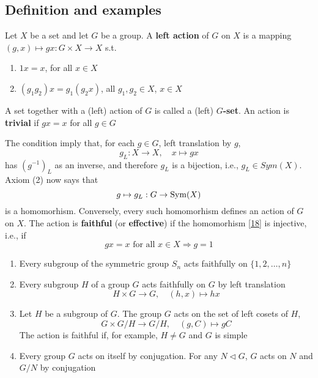 \documentclass[11pt]{article}
\begin{document}
\subsection{Definition and examples}
\label{sec:orge1a0126}
\begin{definition}[]
Let \(X\) be a set and let \(G\) be a group. A \textbf{left action} of \(G\) on \(X\) is a
mapping \((g,x)\mapsto gx:G\times X\to X\) s.t.
\begin{enumerate}
\item \(1x=x\), for all \(x\in X\)
\item \((g_1g_2)x=g_1(g_2x)\), all \(g_1,g_2\in X\), \(x\in X\)
\end{enumerate}


A set together with a (left) action of \(G\) is called a (left) \textbf{\(G\)-set}. An action is \textbf{trivial}
if \(gx=x\) for all \(g\in G\)
\end{definition}

The condition imply that, for each \(g\in G\), left translation by \(g\),
\begin{equation*}
g_L:X\to X,\quad x\mapsto gx
\end{equation*}
has \((g^{-1})_L\) as an inverse, and therefore \(g_L\) is a bijection, i.e., \(g_L\in Sym(X)\).
Axiom (2) now says that
\begin{equation}
g\mapsto g_L:G\to\operatorname{Sym}(X)\label{18}
\end{equation}
is a homomorhism. Conversely, every such homomorhism defines an action of \(G\) on \(X\). The
action is \textbf{faithful} (or \textbf{effective}) if the homomorhism \eqref{18} is injective, i.e., if
\begin{equation*}
gx=x\text{ for all }x\in X\Rightarrow g=1
\end{equation*}

\begin{examplle}[]
\begin{enumerate}
\item Every subgroup of the symmetric group \(S_n\) acts faithfully on \(\{1,2,\dots,n\}\)
\item Every subgroup \(H\) of a group \(G\) acts faithfully on \(G\) by left translation
\begin{equation*}
H\times G\to G,\quad(h,x)\mapsto hx
\end{equation*}
\item Let \(H\) be a subgroup of \(G\). The group \(G\) acts on the set of left cosets of \(H\),
\begin{equation*}
G\times G/H\to G/H,\quad(g,C)\mapsto gC
\end{equation*}
The action is faithful if, for example, \(H\neq G\) and \(G\) is simple
\item Every group \(G\) acts on itself by conjugation. For any \(N\lhd G\), \(G\) acts on \(N\)
and \(G/N\) by conjugation
\end{enumerate}
\end{examplle}
\end{document}
